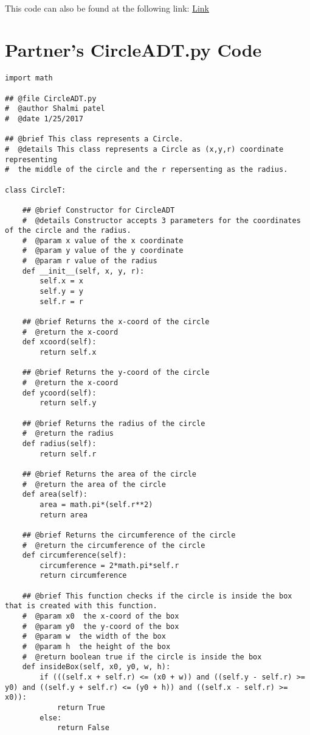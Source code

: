\documentclass[12pt]{article}
\begin{document}
~\newline

\noindent This code can also be found at the following link:
\href{https://gitlab.cas.mcmaster.ca/se2aa4_cs2me3_assignments/patelm16/blob/master/A1/Makefile}{Link}

\newpage

\section{Partner's CircleADT.py Code} \label{PartnerCircleSect}
\begin{lstlisting}
import math

## @file CircleADT.py
#  @author Shalmi patel
#  @date 1/25/2017

## @brief This class represents a Circle. 
#  @details This class represents a Circle as (x,y,r) coordinate representing
#  the middle of the circle and the r repersenting as the radius. 	

class CircleT:
    
    ## @brief Constructor for CircleADT
    #  @details Constructor accepts 3 parameters for the coordinates of the circle and the radius.
    #  @param x value of the x coordinate
    #  @param y value of the y coordinate
    #  @param r value of the radius
    def __init__(self, x, y, r):
        self.x = x
        self.y = y
        self.r = r 
        
    ## @brief Returns the x-coord of the circle
    #  @return the x-coord
    def xcoord(self):
        return self.x
    
    ## @brief Returns the y-coord of the circle
    #  @return the x-coord
    def ycoord(self):
        return self.y
    
    ## @brief Returns the radius of the circle
    #  @return the radius
    def radius(self):
        return self.r 

    ## @brief Returns the area of the circle
    #  @return the area of the circle
    def area(self):
        area = math.pi*(self.r**2)
        return area
    
    ## @brief Returns the circumference of the circle
    #  @return the circumference of the circle
    def circumference(self):
        circumference = 2*math.pi*self.r
        return circumference
    
    ## @brief This function checks if the circle is inside the box that is created with this function.
    #  @param x0  the x-coord of the box
    #  @param y0  the y-coord of the box
    #  @param w  the width of the box
    #  @param h  the height of the box
    #  @return boolean true if the circle is inside the box
    def insideBox(self, x0, y0, w, h):
        if (((self.x + self.r) <= (x0 + w)) and ((self.y - self.r) >= y0) and ((self.y + self.r) <= (y0 + h)) and ((self.x - self.r) >= x0)):
            return True
        else:
            return False
        

\end{lstlisting}
\end{document}
